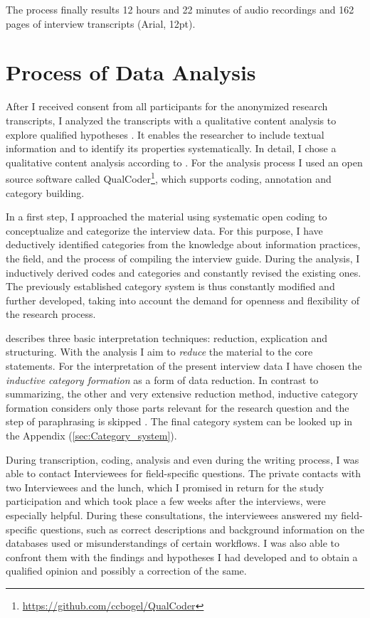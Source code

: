 \documentclass[12pt, a4paper, titlepage, oneside, abstract=true, toc=listof, toc=bibliography]{scrreprt}
\begin{document}
The process finally results 12 hours and 22 minutes of audio recordings and 162 pages of interview transcripts (Arial, 12pt). 

\section{Process of Data Analysis}
After I received consent from all participants for the anonymized research transcripts, I analyzed the transcripts with a qualitative content analysis to explore qualified hypotheses \citep{Kohlbacher2006, Krippendorff2012, Mayring2000, Mayring2014}. It enables the researcher to include textual information and to identify its properties systematically. In detail, I chose a qualitative content analysis according to \citet{Mayring2014}. For the analysis process I used an open source software called QualCoder\footnote{\url{https://github.com/ccbogel/QualCoder}}, which supports coding, annotation and category building. 

In a first step, I approached the material using systematic open coding \citep{Corbin1990} to conceptualize and categorize the interview data. For this purpose, I have deductively identified categories from the knowledge about information practices, the field, and the process of compiling the interview guide. During the analysis, I inductively derived codes and categories and constantly revised the existing ones. The previously established category system is thus constantly modified and further developed, taking into account the demand for openness and flexibility of the research process. 

\citet[p. 65]{Mayring2014} describes three basic interpretation techniques: reduction, explication and structuring. With the analysis I aim to \textit{reduce} the material to the core statements. For the interpretation of the present interview data I have chosen the \textit{inductive category formation} as a form of data reduction. In contrast to summarizing, the other and very extensive reduction method, inductive category formation considers only those parts relevant for the research question and the step of paraphrasing is skipped \cite[p. 79]{Mayring2014}. The final category system can be looked up in the Appendix (\ref{sec:Category_system}).

During transcription, coding, analysis and even during the writing process, I was able to contact Interviewees for field-specific questions. The private contacts with two Interviewees and the lunch, which I promised in return for the study participation and which  took place a few weeks after the interviews, were especially helpful. During these consultations, the interviewees answered my field-specific questions, such as correct descriptions and background information on the databases used or misunderstandings of certain workflows. I was also able to confront them with the findings and hypotheses I had developed and to obtain a qualified opinion and possibly a correction of the same.
	
\end{document}
